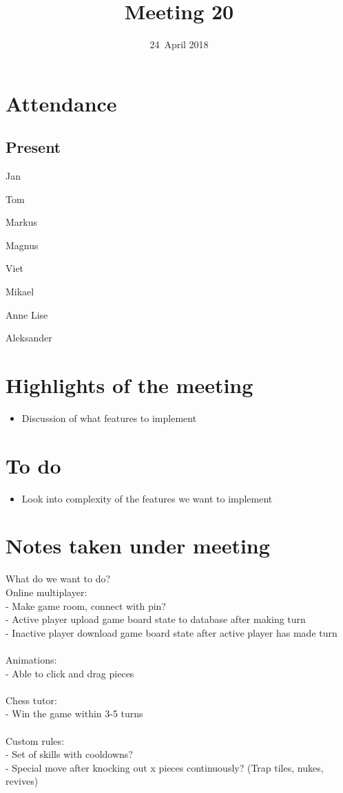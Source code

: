 \documentclass[letterpaper,11pt]{article}
\title{Meeting 20}
\date{24~April 2018}
\begin{document}
\maketitle
\section*{Attendance}
\subsection*{Present}
\begin{list}{}{}
	\item Jan
	\item Tom
	\item Markus
	\item Magnus
	\item Viet
	\item Mikael
	\item Anne Lise
	\item Aleksander
\end{list}

\newpage
\section*{Highlights of the meeting}
\begin{itemize}
	\item Discussion of what features to implement
\end{itemize}

\section*{To do}
\begin{itemize}
	\item Look into complexity of the features we want to implement
\end{itemize}

\section*{Notes taken under meeting}
What do we want to do?\\
Online multiplayer:\\
- Make game room, connect with pin?\\
- Active player upload game board state to database after making turn\\
- Inactive player download game board state after active player has made turn\\\\
Animations:\\
- Able to click and drag pieces\\\\
Chess tutor:\\
- Win the game within 3-5 turns\\\\
Custom rules:\\
- Set of skills with cooldowns?\\
- Special move after knocking out x pieces continuously? (Trap tiles, nukes, revives)
\end{document}
